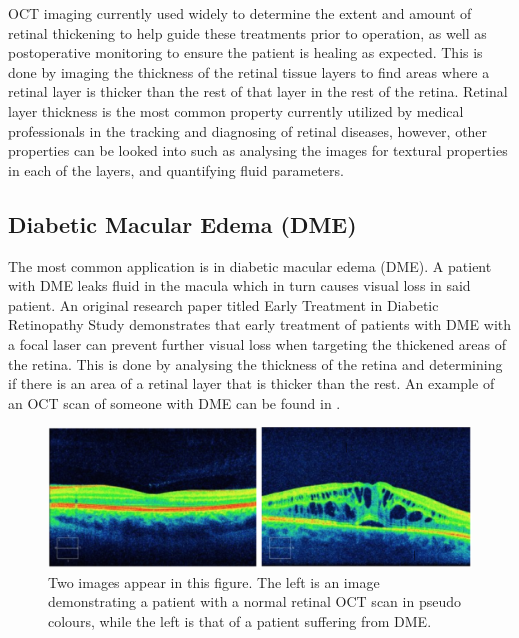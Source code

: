 OCT imaging currently used widely to determine the extent and amount of
retinal thickening to help guide these treatments prior to operation, as well as postoperative 
monitoring to ensure the patient is healing as expected.
This is done by imaging the thickness of the retinal tissue layers to find areas where a
retinal layer is thicker than the rest of that layer in the rest of the retina.  Retinal
layer thickness is the most common property currently utilized by medical professionals
in the tracking and diagnosing of retinal diseases, however, other properties can be looked
into such as analysing the images for textural properties in each of the layers, and quantifying
fluid parameters. \cite{mbib_4}

\subsection{Diabetic Macular Edema (DME)}
The most common application is in diabetic macular edema (DME). A patient with DME  leaks
fluid in the macula which in turn causes visual loss in said patient.  An original research
paper titled Early Treatment in Diabetic Retinopathy Study demonstrates that early treatment
of patients with DME with a focal laser can prevent further visual loss when targeting the
thickened areas of the retina. \cite{mbib_4}  This is done by analysing the thickness of the
retina and determining if there is an area of a retinal layer that is thicker than the rest.
An example of an OCT scan of someone with DME can be found in .

\begin{figure}[htbp]
\centering
\includegraphics{figures/morgan_5}
\caption{Two images appear in this figure.  The left is an image demonstrating a patient with a normal retinal OCT scan in pseudo colours, while the left is that of a patient suffering from DME. \cite{mbib_10} }
\label{fig:m_5}
\end{figure}

